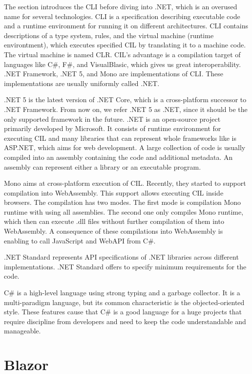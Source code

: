The section introduces the \ac{CLI} \cite{online:cliWiki} before diving into .NET, which is an overused name for several technologies.
CLI is a specification describing executable code and a runtime environment for running it on different architectures.
CLI contains descriptions of a type system, rules, and the virtual machine (runtime environtment), which executes specified \ac{CIL} by translating it to a machine code. 
The virtual machine is named \ac{CLR}.
CIL's advantage is a compilation target of languages like C\#, F\#, and VisualBlasic, which gives us great interoperability.
.NET Framework, .NET 5, and Mono are implementations of CLI.
These implementations are usually uniformly called .NET.
\par
.NET 5 \cite{online:netcoreWiki} is the latest version of .NET Core, which is a cross-platform successor to .NET Framework.
From now on, we refer .NET 5 as .NET, since it should be the only supported framework in the future.
.NET is an open-source project primarily developed by Microsoft.
It consists of runtime environment for executing CIL and many libraries that can represent whole frameworks like is ASP.NET, which aims for web development.
A large collection of code is usually compiled into an assembly containing the code and additional metadata.
An assembly can represent either a library or an executable program.
\par
Mono aims at cross-platform execution of CIL. 
Recently, they started to support compilation \cite{online:monoCompilation} into WebAssembly.
This support allows executing CIL inside browsers.
The compilation has two modes.
The first mode is compilation Mono runtime with using all assemblies.
The second one only compiles Mono runtime, which then can execute .dll files without further compilation of them into WebAssembly.
A consequence of these compilations into WebAssembly is enabling to call JavaScript and WebAPI from C\#.
\par
.NET Standard represents API specifications of .NET libraries across different implementations.
.NET Standard offers to specify minimum requirements for the code.
\par
C\# is a high-level language using strong typing and a garbage collector.
It is a multi-paradigm language, but its common characteristic is the objected-oriented style.
These features cause that C\# is a good language for a huge projects that require discipline from developers and need to keep the code understandable and manageable.

\section{Blazor}

